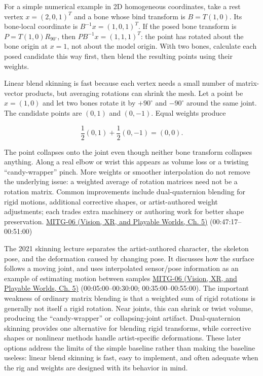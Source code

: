 For a simple numerical example in 2D homogeneous coordinates, take a rest vertex \(x=(2,0,1)^T\) and a bone whose bind transform is \(B=T(1,0)\). Its bone-local coordinate is \(B^{-1}x=(1,0,1)^T\). If the posed bone transform is \(P=T(1,0)R_{90^\circ}\), then \(PB^{-1}x=(1,1,1)^T\): the point has rotated about the bone origin at \(x=1\), not about the model origin. With two bones, calculate each posed candidate this way first, then blend the resulting points using their weights.

Linear blend skinning is fast because each vertex needs a small number of matrix-vector products, but averaging rotations can shrink the mesh. Let a point be \(x=(1,0)\) and let two bones rotate it by \(+90^\circ\) and \(-90^\circ\) around the same joint. The candidate points are \((0,1)\) and \((0,-1)\). Equal weights produce

\[
\frac12(0,1)+\frac12(0,-1)=(0,0).
\]

The point collapses onto the joint even though neither bone transform collapses anything. Along a real elbow or wrist this appears as volume loss or a twisting ``candy-wrapper'' pinch. More weights or smoother interpolation do not remove the underlying issue: a weighted average of rotation matrices need not be a rotation matrix. Common improvements include dual-quaternion blending for rigid motions, additional corrective shapes, or artist-authored weight adjustments; each trades extra machinery or authoring work for better shape preservation. \href{../07-Vision-XR-and-Playable-Worlds/main.pdf\#nameddest=04-visual-computing-ii-ch036-mitg-06---animation-skinningenveloping}{MITG-06 (Vision, XR, and Playable Worlds, Ch. 5)} (00:47:17--00:51:00)

The 2021 skinning lecture separates the artist-authored character, the skeleton pose, and the deformation caused by changing pose. It discusses how the surface follows a moving joint, and uses interpolated sensor/pose information as an example of estimating motion between samples \href{../07-Vision-XR-and-Playable-Worlds/main.pdf\#nameddest=04-visual-computing-ii-ch036-mitg-06---animation-skinningenveloping}{MITG-06 (Vision, XR, and Playable Worlds, Ch. 5)} (00:05:00--00:30:00; 00:35:00--00:55:00). The important weakness of ordinary matrix blending is that a weighted sum of rigid rotations is generally not itself a rigid rotation. Near joints, this can shrink or twist volume, producing the ``candy-wrapper'' or collapsing-joint artifact. Dual-quaternion skinning provides one alternative for blending rigid transforms, while corrective shapes or nonlinear methods handle artist-specific deformations. These later options address the limits of the simple baseline rather than making the baseline useless: linear blend skinning is fast, easy to implement, and often adequate when the rig and weights are designed with its behavior in mind.

